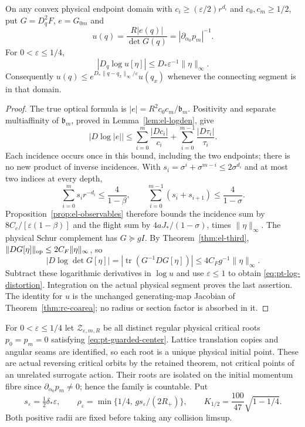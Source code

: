 \begin{lemma}
\label{lem:pt-distortion}
On any convex physical endpoint domain with
$c_i\ge(\varepsilon/2)r^{d_i}$ and $c_0,c_m\ge1/2$, put
$G=D_q^2F$, $e=G_{0m}$ and
\[
 u(q)=\frac{R|e(q)|}{\det G(q)}
     =|\partial_{\alpha_0}p_m|^{-1}.
\]
For $0<\varepsilon\le1/4$,
\begin{equation}\label{eq:pt-log-distortion}
 |D_q\log u[\eta]|\le D_*\varepsilon^{-1}\|\eta\|_\infty.
\end{equation}
Consequently $u(q)\le e^{D_*\|q-q_x\|_\infty/\varepsilon}u(q_x)$
whenever the connecting segment is in that domain.
\end{lemma}
\begin{proof}
The true optical formula is
$|e|=R^2c_0c_m/\mathfrak b_m$.  Positivity and separate
multiaffinity of $\mathfrak b_m$, proved in
Lemma~\ref{lem:el-logden}, give
\[
 |D\log|e||\le\sum_{i=0}^m\frac{|Dc_i|}{c_i}
                  +\sum_{i=0}^{m-1}\frac{|D\tau_i|}{\tau_i}.
\]
Each incidence occurs once in this bound, including the two endpoints;
there is no new product of inverse incidences.  With
$s_i=\sigma^i+\sigma^{m-i}\le2\sigma^{d_i}$ and at most two
indices at every depth,
\[
 \sum_{i=0}^m s_i r^{-d_i}\le\frac4{1-\beta},\qquad
 \sum_{i=0}^{m-1}(s_i+s_{i+1})\le\frac4{1-\sigma}.
\]
Proposition~\ref{prop:el-observables} therefore bounds the incidence
sum by $8C_c/[\varepsilon(1-\beta)]$ and the flight sum by
$4aJ_* /(1-\sigma)$, times $\|\eta\|_\infty$.
The physical Schur complement has $G\succeq gI$.  By
Theorem~\ref{thm:el-third}, $\|DG[\eta]\|_{\rm op}\le
2C_F\|\eta\|_\infty$, so
\[
 |D\log\det G[\eta]|
 =|\operatorname{tr}(G^{-1}DG[\eta])|
 \le4C_Fg^{-1}\|\eta\|_\infty.
\]
Subtract these logarithmic derivatives in $\log u$ and use
$\varepsilon\le1$ to obtain \eqref{eq:pt-log-distortion}.
Integration on the actual physical segment proves the last assertion.
The identity for $u$ is the unchanged generating-map Jacobian of
Theorem~\ref{thm:rc-coarea}; no radius or section factor is absorbed in it.
\end{proof}

For $0<\varepsilon\le1/4$ let $\mathscr Z_{\varepsilon,m,R}$ be
all distinct regular physical critical roots $p_0=p_m=0$ satisfying
\eqref{eq:pt-guarded-center}.  Lattice translation copies and angular
seams are identified, so each root is a unique physical initial point.
These are actual reversing critical orbits by the retained theorem,
not critical points of an unrelated surrogate action.  Their roots are
isolated on the initial momentum fibre since
$\partial_{\alpha_0}p_m\ne0$; hence the family is countable.
Put
\begin{equation}\label{eq:pt-momentum-radius}
 s_\varepsilon=\tfrac12\delta_*\varepsilon,
 \qquad
 \rho_\varepsilon=\min\{1/4,\,g s_\varepsilon/(2R_+)\},
 \qquad K_{1/2}=\frac{100}{47}\sqrt{1-1/4}.
\end{equation}
Both positive radii are fixed before taking any collision limsup.

